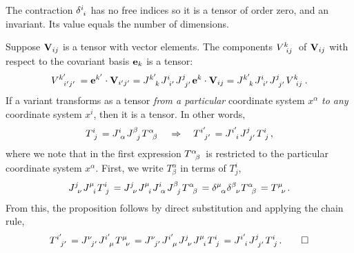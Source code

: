 \documentclass{article}
\begin{document}
	\begin{corollary}
		The contraction $ \delta\indices{^{i}_{i}} $ has no free indices so it is a tensor of order zero, and an invariant. Its value equals the number of dimensions.
	\end{corollary}
	\example Suppose $ \vb{V}_{ij} $ is a tensor with vector elements. The components $ V\indices{^{k}_{ij}} $ of $ \vb{V}_{ij} $ with respect to the covariant basis $ \vb{e}_{k} $ is a tensor:
	\[
	V\indices{^{k^\prime}_{i^\prime j^\prime}} = \vb{e}^{k^\prime} \cdot \vb{V}_{i^\prime j ^\prime}
	= J\indices{^{k^\prime}_{k}}  J\indices{^{i}_{i^\prime}} J\indices{^{j}_{j^\prime}}  \vb{e}^{k} \cdot\vb{V}_{ij}
	=  J\indices{^{k^\prime}_{k}}  J\indices{^{i}_{i^\prime}} J\indices{^{j}_{j^\prime}}  V\indices{^{k}_{ij}}.
	\]
	\proposition If a variant transforms as a tensor \textit{from a particular} coordinate system $ x^{\alpha} $ \textit{to any} coordinate system $ x^{i} $, then it is a tensor. In other words,
	\[
	T\indices{^{i}_{j}} = J\indices{^{i}_{\alpha}} J\indices{^{\beta}_{j}} T\indices{^{\alpha}_{\beta}} \implies T\indices{^{i^\prime}_{j^\prime}} = J\indices{^{i^\prime}_{i}} J\indices{^{j}_{j^\prime}} T\indices{^{i}_{j}},
	\]
	where we note that in the first expression $ T\indices{^{\alpha}_{\beta}} $ is restricted to the particular coordinate system $ x^{\alpha} $.
	\proof First, we write $ T^{\alpha}_{\beta} $ in terms of $ T^{i}_{j} $,
	\[
	J\indices{^{j}_{\nu}} J\indices{^{\mu}_{i}} T\indices{^{i}_{j}} = J\indices{^{j}_{\nu}} J\indices{^{\mu}_{i}} J\indices{^{i}_{\alpha}} J\indices{^{\beta}_{j}} T\indices{^{\alpha}_{\beta}}
	= \delta\indices{^{\mu}_{\alpha}} \delta\indices{^{\beta}_{\nu}} T\indices{^{\alpha}_{\beta}} = T\indices{^{\mu}_{\nu}}.
	\]
	From this, the proposition follows by direct substitution and applying the chain rule,
	\[
	T\indices{^{i^\prime}_{j^\prime}} = J\indices{^{\nu}_{j^\prime}} J\indices{^{i^\prime}_{\mu}} T\indices{^{\mu}_{\nu}}
	= J\indices{^{\nu}_{j^\prime}} J\indices{^{i^\prime}_{\mu} } J\indices{^{j}_{\nu}} J\indices{^{\mu}_{i}} T\indices{^{i}_{j} }
	= J\indices{^{i^\prime}_{i}} J\indices{^{j}_{j^\prime}} T\indices{^{i}_{j}}. \qed
	\]
\end{document}
